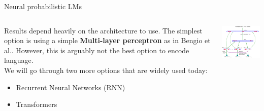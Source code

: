 \documentclass[9pt]{beamer}
\begin{document}
\begin{frame}{Neural probabilistic LMs}
\vspace{0.3cm}\\
\begin{columns}[onlytextwidth]
    \begin{column}{0.50\textwidth}
    Results depend heavily on the architecture to use.
    The simplest option is using a simple \textbf{Multi-layer perceptron} as in Bengio et al.. %
    However, this is arguably not the best option to encode language.
    \vspace{0.2cm}\\ We will go through two more options that are widely used today:
    \begin{itemize}
        \item Recurrent Neural Networks (RNN)
        \item Transformers
    \end{itemize}
    \end{column}
    \begin{column}{0.50\textwidth}
        \centering
        \includegraphics[width = 6cm]{img/bengio.png}
    \end{column}
\end{columns}
\end{frame}

\end{document}
